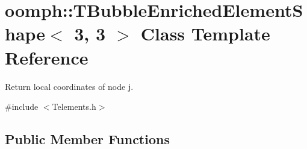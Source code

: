 \hypertarget{classoomph_1_1TBubbleEnrichedElementShape_3_013_00_013_01_4}{}\section{oomph\+:\+:T\+Bubble\+Enriched\+Element\+Shape$<$ 3, 3 $>$ Class Template Reference}
\label{classoomph_1_1TBubbleEnrichedElementShape_3_013_00_013_01_4}


Return local coordinates of node j.  




{\ttfamily \#include $<$Telements.\+h$>$}

\subsection*{Public Member Functions}
